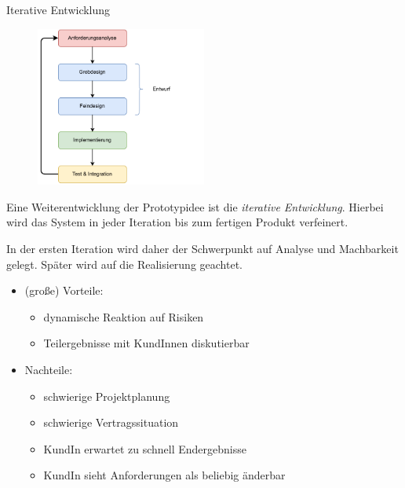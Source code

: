 \begin{defi}{Iterative Entwicklung}
    \begin{figure}
        \centering
        \includegraphics[width=0.5\textwidth]{includes/figures/defi_iterative_development.pdf}
    \end{figure}

    Eine Weiterentwicklung der Prototypidee ist die \emph{iterative Entwicklung}.
    Hierbei wird das System in jeder Iteration bis zum fertigen Produkt verfeinert.

    In der ersten Iteration wird daher der Schwerpunkt auf Analyse und Machbarkeit gelegt.
    Später wird auf die Realisierung geachtet.

    \begin{itemize}
        \item (große) Vorteile:
              \begin{itemize}
                  \item dynamische Reaktion auf Risiken
                  \item Teilergebnisse mit KundInnen diskutierbar
              \end{itemize}
        \item Nachteile:
              \begin{itemize}
                  \item schwierige Projektplanung
                  \item schwierige Vertragssituation
                  \item KundIn erwartet zu schnell Endergebnisse
                  \item KundIn sieht Anforderungen als beliebig änderbar
              \end{itemize}
    \end{itemize}
\end{defi}

